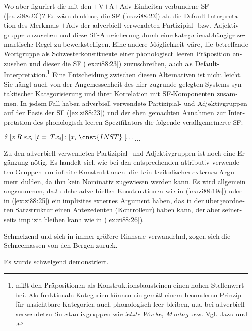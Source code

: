 \documentclass[output=paper,colorlinks,citecolor=brown, booklanguage=german]{langscibook}
\begin{document}
\begin{otherlanguage}{german}
Wo aber figuriert die mit den $+$V$+$A$+$Adv-Einheiten verbundene SF (\ref{ex:zi88:23})? Es wäre denkbar, die SF (\ref{ex:zi88:23}) als die Default-In\-ter\-pre\-ta\-tion des Merkmals $+$Adv der adverbiell verwendeten Partizipial- bzw. Adjektivgruppe anzusehen und diese SF-Anreicherung durch eine kategorienabhängige semantische Regel zu bewerkstelligen. Eine andere Möglichkeit wäre, die betreffende Wortgruppe als Schwe\-ster\-kon\-sti\-tu\-en\-te einer phonologisch leeren Präposition anzusehen und dieser die SF (\ref{ex:zi88:23}) zuzuschreiben, auch als Default-Interpretation.\footnote{\citet{Emonds1985,Emonds1987} mißt den Präpositionen als Konstruktionsbausteinen einen hohen Stellenwert bei. Als funktionale Kategorien können sie gemäß einem besonderen Prinzip für unsichtbare Kategorien auch phonologisch leer bleiben, u.a. bei adverbiell verwendeten Substantivgruppen wie \textit{letzte Woche}, \textit{Montag} usw. Vgl. dazu \citet{Steinitz.Lang1969,Bresnan.Grimshaw1987} und \citet{Larson1985,Larson1987}.} Eine Entscheidung zwi\-schen diesen Alternativen ist nicht leicht. Sie hängt auch von der Angemessenheit des hier zugrunde gelegten Systems syntaktischer Kategorisierung und ihrer Korrelation mit SF-Komponenten zusammen. In jedem Fall haben adverbiell verwendete Partizipial- und Adjektivgruppen auf der Basis der SF (\ref{ex:zi88:23}) und der eben gemachten Annahmen zur Interpretation des phonologisch leeren Spezifikators die folgende verallgemeinerte SF:

\ea\label{ex:zi88:24} $\hat{z} \; [z \; R \; \varepsilon x_i \; [t = \; Tx_i] : [x_i \; \cnst{INST} \; [\dots]]]$
\z 

\noindent Zu den adverbiell verwendeten Partizipial- und Adjektivgruppen ist noch eine Ergänzung nötig. Es handelt sich wie bei den entsprechenden attributiv verwendeten Gruppen um infinite Konstruktionen, die kein lexikalisches externes Argument dulden, da ihm kein Nominativ zugewiesen werden kann. Es wird allgemein angenommen, daß solche adverbiellen Konstruktionen wie in (\ref{ex:zi88:19c}) oder in (\ref{ex:zi88:25}) ein implizites externes Argument haben, das in der übergeordneten Satzstruktur einen Antezedenten (Kontrolleur) haben kann, der aber seinerseits implizit bleiben kann wie in (\ref{ex:zi88:26}).

\ea\label{ex:zi88:25} Schmelzend und sich in immer größere Rinnsale verwandelnd, zogen sich die Schneemassen von den Bergen zurück.
\z 

\ea\label{ex:zi88:26} Es wurde schweigend demonstriert.
\z 


\end{otherlanguage}
\end{document}
